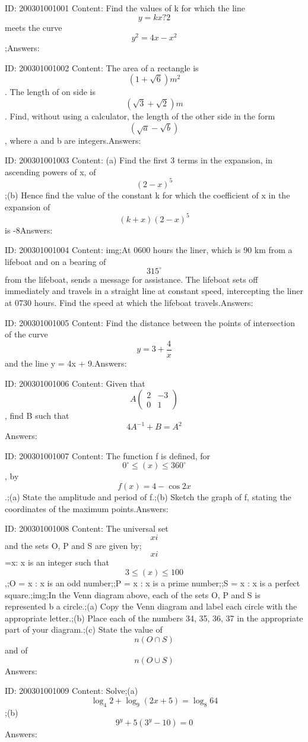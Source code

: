 \documentclass{article}
\begin{document}
ID: 200301001001
Content:
Find the values of k for which the line $$y = kx ? 2$$ meets the curve $$y^2=4x-x^2$$;Answers:

ID: 200301001002
Content:
The area of a rectangle is $$(1+\sqrt6)m^2$$. The length of on side is $$(\sqrt3+\sqrt2)m$$. Find, without using a calculator, the length of the other side in the form $$(\sqrt{a}-\sqrt{b})$$, where a and b are integers.Answers:

ID: 200301001003
Content:
(a)	Find the first 3 terms in the expansion, in ascending powers of x, of $$(2-x)^5$$;(b)	Hence find the value of the constant k for which the coefficient of x in the expansion of $$(k+x)(2-x)^5$$ is -8Answers:

ID: 200301001004
Content:
img;At 0600 hours the liner, which is 90 km from a lifeboat and on a bearing of $$315^{\circ}$$ from the lifeboat, sends a message for assistance. The lifeboat sets off immediately and travels in a straight line at constant speed, intercepting the liner at 0730 hours. Find the speed at which the lifeboat travels.Answers:

ID: 200301001005
Content:
Find the distance between the points of intersection of the curve $$y=3 + \frac{4}{x}$$ and the line y = 4x + 9.Answers:

ID: 200301001006
Content:
Given that $$A\begin{pmatrix}2 &-3 \\ 0 &1 \end{pmatrix}$$, find B such that $$4A^{-1}+B=A^2$$Answers:

ID: 200301001007
Content:
The function f is defined, for $$0^{\circ}\leq(x)\leq360^{\circ}$$, by $$f(x) = 4 - \cos 2x$$.;(a)	State the amplitude and period of f.;(b)	Sketch the graph of f, stating the coordinates of the maximum points.Answers:

ID: 200301001008
Content:
The universal set $$xi$$ and the sets O, P and S are given by;$$xi$$={x: x is an integer such that $$3\leq(x)\leq100$$} ,;O = {x : x is an odd number};;P = {x : x is a prime number};;S = {x : x is a perfect square}.;img;In the Venn diagram above, each of the sets O, P and S is represented b a circle.;(a)	Copy the Venn diagram and label each circle with the appropriate letter.;(b)	Place each of the numbers 34, 35, 36, 37 in the appropriate part of your diagram.;(c) State the value of $$n(O \cap S)$$ and of $$n(O \cup S)$$Answers:

ID: 200301001009
Content:
Solve;(a) $$\log_4 2+\log_9(2x+5)=\log_8 64$$;(b) $$9^y+5(3^y-10)=0$$Answers:
\end{document}

